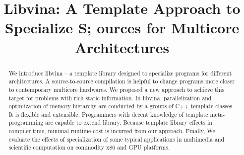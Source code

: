 \documentclass[10pt, conference, compsocconf]{IEEEtran}
\begin{document}
%
\title{Libvina: A Template Approach to Specialize S;
ources for Multicore Architectures}





% 
\author{}








\maketitle


\begin{abstract}
We introduce libvina -- a template library designed to specialize programs for different architectures. A source-to-source compilation is helpful to change programs more closer to contemporary multicore hardwares. We proposed a new approach to achieve this target for problems with rich static information. In libvina, parallelization and optimization of memory hierarchy are conducted by a groups of C++ template classes. It is flexible and extensible. Programmers with decent knowledge of template meta-programming are capable to extend library. Because template library effects in compiler time, minimal runtime cost is incurred from our approach. Finally, We evaluate the effects of specialization of some typical applications in multimedia and scientific computation on commodity x86 and GPU platforms.
\end{abstract}
\end{document}
